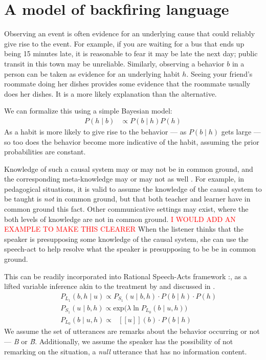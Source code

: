 \documentclass[10pt,letterpaper]{article}
\newcommand{\denote}[1]{\mbox{ $[\![ #1 ]\!]$}}
\newcommand{\red}[1]{\textcolor{Red}{#1}}
\begin{document}
\section{A model of backfiring language}

Observing an event is often evidence for an underlying cause that could reliably give rise to the event.
For example, if you are waiting for a bus that ends up being 15 minutes late, it is reasonable to fear it may be late the next day; public transit in this town may be unreliable. 
Similarly, observing a behavior $b$ in a person can be taken as evidence for an underlying habit $h$. 
Seeing your friend's roommate doing her dishes provides some evidence that the roommate usually does her dishes. 
It is a more likely explanation than the alternative.

We can formalize this using a simple Bayesian model:
\begin{align*}
P(h \mid b) & \propto P(b \mid h) P(h) 
\end{align*}
As a habit is more likely to give rise to the behavior --- as $P(b \mid h)$ gets large --- so too does the behavior become more indicative of the habit, assuming the prior probabilities are constant. 

Knowledge of such a causal system may or may not be in common ground, and the corresponding meta-knowledge may or may not as well \cite{Clark1977, Clark1996}. 
For example, in pedagogical situations, it is valid to assume the knowledge of the causal system to be taught is \emph{not} in common ground, but that both teacher and learner have in common ground this fact.
Other communicative settings may exist, where the both levels of knowledge are not in common ground.  \red{I WOULD ADD AN EXAMPLE TO MAKE THIS CLEARER}
When the listener thinks that the speaker is presupposing some knowledge of the causal system, she can use the speech-act to help resolve what the speaker is presupposing to be be in common ground.

This can be readily incorporated into Rational Speech-Acts framework \cite{Frank2012, Goodman2013}:, as a lifted variable inference akin to the treatment by  and discussed in .
%
\begin{eqnarray}
&&P_{L_1}(b, h \mid u)\propto P_{S_1}(u \mid b, h)\cdot P(b \mid h) \cdot P(h) \label{eq:L1}\\
&&P_{S_1}(u \mid b, h) \propto \mathrm{exp}({\lambda \ln P_{L_0}(b \mid u, h))} \label{eq:S1}\\
&&P_{L_0}(b \mid u, h)\propto \denote{u}(b) \cdot P(b \mid h) \label{eq:L0}
\end{eqnarray}
%
We assume the set of utterances are remarks about the behavior occurring or not --- \emph{B} or \emph{\~B}. 
Additionally, we assume the speaker has the possibility of not remarking on the situation, a \emph{null} utterance that has no information content.  
\end{document}
